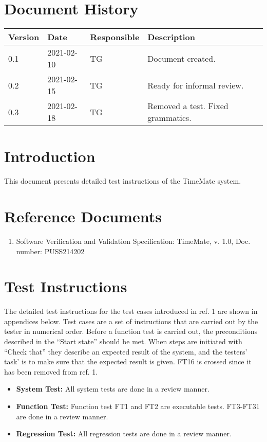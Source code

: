 \documentclass{article}
\date {#1}
\title {
    \documentNumber {03}    
    
    \documentVersion {0.3}
    
    \documentTitle {Software Verification and Validation Instructions}
    \documentGroup {2}
 
    \documentResponsible {Test Group}
    \documentAuthors {Test Group}
    
    \documentDate {2021-02-18}
}
\begin{document}
\maketitle
\thispagestyle{empty}

\newpage

\tableofcontents

\newpage


\section{Document History}
\begin{tabular}{ l | l | l | l }
    Version & Date & Responsible & Description \\
    \hline
   0.1 & 2021-02-10 & TG & Document created. \\
   0.2 & 2021-02-15 & TG & Ready for informal review. \\
    0.3 & 2021-02-18 & TG & Removed a test. Fixed grammatics. \\
\end{tabular}

\section{Introduction}
This document presents detailed test instructions of the  TimeMate system.

\section{Reference Documents}
\begin{enumerate}
	\item Software Verification and Validation Specification: 	TimeMate, v. 1.0, Doc. number: PUSS214202
\end{enumerate}

\section{Test Instructions}
The detailed test instructions for the test cases introduced in ref. 1 are shown in appendices below. Test cases are a set of instructions that are carried out by the tester in numerical order. Before a function test is carried out, the preconditions described in the “Start state” should be met. When steps are initiated with “Check that” they describe an expected result of the system, and the testers' task' is to make sure that the expected result is given. FT16 is crossed since it has been removed from ref. 1.
\begin{itemize}
\item \textbf{System Test:} All system tests are done in a review manner. 
\item \textbf{Function Test:} Function test FT1 and FT2 are executable tests. FT3-FT31 are done in a review manner. 
\item \textbf{Regression Test:} All regression tests are done in a review manner. 

\end{itemize}
\end{document}
